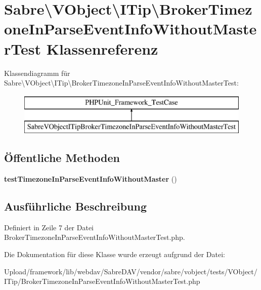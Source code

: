 \hypertarget{class_sabre_1_1_v_object_1_1_i_tip_1_1_broker_timezone_in_parse_event_info_without_master_test}{}\section{Sabre\textbackslash{}V\+Object\textbackslash{}I\+Tip\textbackslash{}Broker\+Timezone\+In\+Parse\+Event\+Info\+Without\+Master\+Test Klassenreferenz}
\label{class_sabre_1_1_v_object_1_1_i_tip_1_1_broker_timezone_in_parse_event_info_without_master_test}
Klassendiagramm für Sabre\textbackslash{}V\+Object\textbackslash{}I\+Tip\textbackslash{}Broker\+Timezone\+In\+Parse\+Event\+Info\+Without\+Master\+Test\+:\begin{figure}[H]
\begin{center}
\leavevmode
\includegraphics[height=2.000000cm]{class_sabre_1_1_v_object_1_1_i_tip_1_1_broker_timezone_in_parse_event_info_without_master_test}
\end{center}
\end{figure}
\subsection*{Öffentliche Methoden}
\begin{DoxyCompactItemize}
\item 
\mbox{\label{class_sabre_1_1_v_object_1_1_i_tip_1_1_broker_timezone_in_parse_event_info_without_master_test_a8a21672b20f126ca5e7ff1ab0e91b82a}} 
{\bfseries test\+Timezone\+In\+Parse\+Event\+Info\+Without\+Master} ()
\end{DoxyCompactItemize}


\subsection{Ausführliche Beschreibung}


Definiert in Zeile 7 der Datei Broker\+Timezone\+In\+Parse\+Event\+Info\+Without\+Master\+Test.\+php.



Die Dokumentation für diese Klasse wurde erzeugt aufgrund der Datei\+:\begin{DoxyCompactItemize}
\item 
Upload/framework/lib/webdav/\+Sabre\+D\+A\+V/vendor/sabre/vobject/tests/\+V\+Object/\+I\+Tip/Broker\+Timezone\+In\+Parse\+Event\+Info\+Without\+Master\+Test.\+php\end{DoxyCompactItemize}
